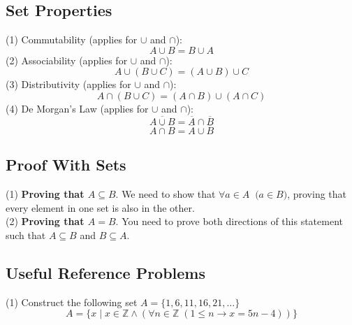 \subsection{Set Properties}
(1) Commutability (applies for $\cup$ and $\cap$): 
$$
A \cup B = B \cup A
$$
(2) Associability (applies for $\cup$ and $\cap$):
$$
A \cup (B \cup C) = (A \cup B) \cup C
$$
(3) Distributivity (applies for $\cup$ and $\cap$):
$$
A \cap (B \cup C) = (A \cap B) \cup (A \cap C)
$$
(4) De Morgan's Law (applies for $\cup$ and $\cap$):
$$
\overline{A \cup B} = \overline{A} \cap \overline{B}
$$
$$
\overline{A \cap B} = \overline{A} \cup \overline{B}
$$
\pagebreak
\subsection{Proof With Sets}
(1) \textbf{Proving that $A \subseteq B$}. We need to show that $\forall a \in A\;\;\Big(a \in B\Big)$, proving that every element in one set is also in the other. \\
(2) \textbf{Proving that $A = B$}. You need to prove both directions of this statement such that $A \subseteq B$ and $B \subseteq A$.
\subsection{Useful Reference Problems}
(1) Construct the following set $A = \{1,6,11,16,21,\dots\}$
$$
A = \{x\;|\;x \in \mathbb{Z} \wedge (\forall n \in \mathbb{Z}\;(1\leq n \rightarrow x = 5n-4))\}
$$

